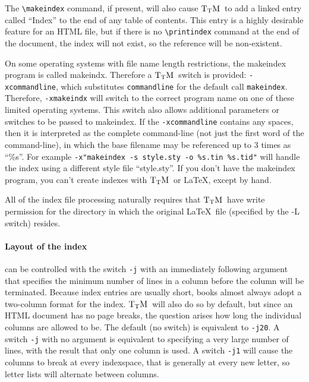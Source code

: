 \documentclass[12pt]{article}
\def\TtM{$\rm{}T_TH$}
\def\TtM{$\rm{}T_TM$}%
\begin{document}
The \verb+\makeindex+ command, if present, will also cause \TtM\ to add
a linked entry called ``Index'' 
to the end of any table of contents. This entry is a highly desirable
feature for an HTML file, but if there is no \verb+\printindex+
command at the end of the document, the index will not exist, so the
reference will be non-existent.

On some operating systems with file name length restrictions, the
makeindex program is called makeindx. Therefore a \TtM\ switch is
provided: \verb+-xcommandline+, which substitutes \verb+commandline+
for the default call \verb+makeindex+. Therefore, \verb+-xmakeindx+
will switch to the correct program name on one of these limited
operating systems. This switch also allows additional parameters or
switches to be passed to makeindex. If the \verb+-xcommandline+
contains any spaces, then it is interpreted as the complete
command-line (not just the first word of the command-line), in which
the base filename may be referenced up to 3 times as ``\%s''. For
example
\verb+-x"makeindex -s style.sty -o %s.tin %s.tid"+ will handle the
index using a different style file ``style.sty''.
If you don't have the makeindex program, you can't create indexes with
\TtM\ or \LaTeX, except by hand.

All of the index file processing naturally requires that \TtM\ have
write permission for the directory in which the original \LaTeX\ file
(specified by the -L switch) resides.

\paragraph{Layout of the index} can be controlled with the switch
\verb!-j! with an immediately following argument that specifies the
minimum number of lines in a column before the column will be
terminated. Because index entries are usually short, books almost
always adopt a two-column format for the index. \TtM\ will also do so
by default, but since an HTML document has no page breaks, the question
arises how long the individual columns are allowed to be. The default
(no switch) is equivalent to \verb!-j20!. A switch \verb!-j! with no
argument is equivalent to specifying a very large number of lines,
with the result that only one column is used.  A switch \verb!-j1!
will cause the columns to break at every indexspace, that is generally
at every new letter, so letter lists will alternate between columns.
\end{document}
